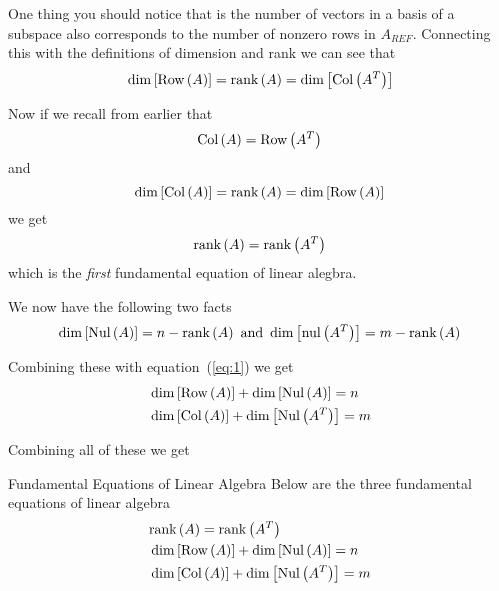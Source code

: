 One thing you should notice that is the number of vectors in a basis of a subspace also corresponds to the number of nonzero rows in $A_{REF}$. Connecting this with the definitions of dimension and rank we can see that 
\begin{equation}{\label{eq:1}}
    \dim\left[\text{Row}\left(A\right)\right] = \text{rank}\left(A\right) = \dim\left[\text{Col}\left(A^{T}\right)\right]
\end{equation}

Now if we recall from earlier that 
\[
    \text{Col}\left(A\right) = \text{Row}\left(A^{T}\right)
\]
and 
\[
    \dim\left[\text{Col}\left(A\right)\right] = \text{rank}\left(A\right) = \dim\left[\text{Row}\left(A\right)\right]
\]
we get 
\begin{equation}{\label{eq:2}}
    \text{rank}\left(A\right) = \text{rank}\left(A^{T}\right)
\end{equation}
which is the \textit{first} fundamental equation of linear alegbra. 

We now have the following two facts 
\[
    \dim\left[\text{Nul}\left(A\right)\right] = n - \text{rank}\left(A\right) \text{ and } \dim\left[\text{nul}\left(A^{T}\right)\right] = m - \text{rank}\left(A\right)
\]

Combining these with equation~(\ref{eq:1}) we get 
\begin{align}
    &\dim\left[\text{Row}\left(A\right)\right] + \dim\left[\text{Nul}\left(A\right)\right] = n \\
    &\dim\left[\text{Col}\left(A\right)\right] + \dim\left[\text{Nul}\left(A^T\right)\right] = m
\end{align}

Combining all of these we get
\begin{impbox}{Fundamental Equations of Linear Algebra}{}
    Below are the three fundamental equations of linear algebra
    \begin{align}
        &\text{rank}\left(A\right) = \text{rank}\left(A^T\right) \\
        &\dim\left[\text{Row}\left(A\right)\right] + \dim\left[\text{Nul}\left(A\right)\right] = n \\
        &\dim\left[\text{Col}\left(A\right)\right] + \dim\left[\text{Nul}\left(A^{T}\right)\right] = m
    \end{align}
\end{impbox}

